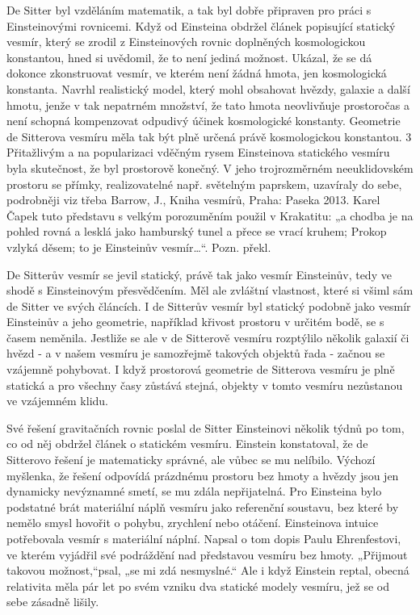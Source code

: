   De Sitter byl vzděláním matematik, a tak byl dobře připraven pro práci s Einsteinovými rovnicemi.
  Když od Einsteina obdržel článek popisující statický vesmír, který se zrodil z Einsteinových
  rovnic doplněných kosmologickou konstantou, hned si uvědomil, že to není jediná možnost. Ukázal,
  že se dá dokonce zkonstruovat vesmír, ve kterém není žádná hmota, jen kosmologická konstanta.
  Navrhl realistický model, který mohl obsahovat hvězdy, galaxie a další hmotu, jenže v tak
  nepatrném množství, že tato hmota neovlivňuje prostoročas a není schopná kompenzovat odpudivý
  účinek kosmologické konstanty. Geometrie de Sitterova vesmíru měla tak být plně určená právě
  kosmologickou konstantou. 3 Přitažlivým a na popularizaci vděčným rysem Einsteinova statického
  vesmíru byla skutečnost, že byl prostorově konečný. V jeho trojrozměrném neeuklidovském prostoru
  se přímky, realizovatelné např. světelným paprskem, uzavíraly do sebe, podrobněji viz třeba
  Barrow, J., Kniha vesmírů, Praha: Paseka 2013. Karel Čapek tuto představu s velkým porozuměním
  použil v Krakatitu: „a chodba je na pohled rovná a lesklá jako hamburský tunel a přece se vrací
  kruhem; Prokop vzlyká děsem; to je Einsteinův vesmír…“. Pozn. překl. 
  
  De Sitterův vesmír se jevil statický, právě tak jako vesmír Einsteinův, tedy ve shodě s
  Einsteinovým přesvědčením. Měl ale zvláštní vlastnost, které si všiml sám de Sitter ve svých
  článcích. I de Sitterův vesmír byl statický podobně jako vesmír Einsteinův a jeho geometrie,
  například křivost prostoru v určitém bodě, se s časem neměnila. Jestliže se ale v de Sitterově
  vesmíru rozptýlilo několik galaxií či hvězd - a v našem vesmíru je samozřejmě takových objektů
  řada - začnou se vzájemně pohybovat. I když prostorová geometrie de Sitterova vesmíru je plně
  statická a pro všechny časy zůstává stejná, objekty v tomto vesmíru nezůstanou ve vzájemném klidu.
  
  Své řešení gravitačních rovnic poslal de Sitter Einsteinovi několik týdnů po tom, co od něj
  obdržel článek o statickém vesmíru. Einstein konstatoval, že de Sitterovo řešení je matematicky
  správné, ale vůbec se mu nelíbilo. Výchozí myšlenka, že řešení odpovídá prázdnému prostoru bez
  hmoty a hvězdy jsou jen dynamicky nevýznamné smetí, se mu zdála nepřijatelná. Pro Einsteina bylo
  podstatné brát materiální náplň vesmíru jako referenční soustavu, bez které by nemělo smysl
  hovořit o pohybu, zrychlení nebo otáčení. Einsteinova intuice potřebovala vesmír s materiální
  náplní. Napsal o tom dopis Paulu Ehrenfestovi, ve kterém vyjádřil své podráždění nad představou
  vesmíru bez hmoty. „Přijmout takovou možnost,“psal, „se mi zdá nesmyslné.“ Ale i když Einstein
  reptal, obecná relativita měla pár let po svém vzniku dva statické modely vesmíru, jež se od sebe
  zásadně lišily. 
  
